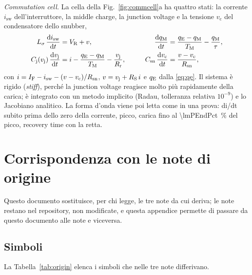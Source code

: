 \documentclass[10pt,a4paper]{scrartcl}
\let\newcommand\pdvaluedefine
\newcommand{\IF}{I_\mathrm{F}}
\newcommand{\VR}{V_\mathrm{R}}
\newcommand{\TM}{T_\mathrm{M}}
\newcommand{\qE}{q_\mathrm{E}}
\newcommand{\qM}{q_\mathrm{M}}
\newcommand{\vj}{v_\mathrm{j}}
\newcommand{\RS}{R_\mathrm{S}}
\newcommand{\Rr}{R_\mathrm{r}}
\newcommand{\Cj}{C_\mathrm{j}}
\newcommand{\Csn}{C_\mathrm{sn}}
\newcommand{\Rsn}{R_\mathrm{sn}}
\newcommand{\diff}{\mathrm{d}}
\newcommand{\Ls}{L_\sigma}                    %
\begin{document}
\emph{Commutation cell.} La cella della Fig.~\ref{fig:commcell}a ha quattro stati: la corrente $i_\mathrm{sw}$ dell'interruttore, la middle charge, la junction voltage e la tensione $v_\mathrm{c}$ del condensatore dello snubber,
\begin{equation}
\begin{aligned}
\Ls\,\frac{\diff i_\mathrm{sw}}{\diff t} &= \VR + v , &\qquad \frac{\diff\qM}{\diff t} &= \frac{\qE-\qM}{\TM} - \frac{\qM}{\tau} , \\
\Cj(\vj)\,\frac{\diff\vj}{\diff t} &= i - \frac{\qE-\qM}{\TM} - \frac{\vj}{\Rr} , &\qquad \Csn\,\frac{\diff v_\mathrm{c}}{\diff t} &= \frac{v - v_\mathrm{c}}{\Rsn} ,
\end{aligned}
\end{equation}
con $i = \IF - i_\mathrm{sw} - (v-v_\mathrm{c})/\Rsn$, $v = \vj + \RS\,i$ e $\qE$ dalla \eqref{eq:qe}. Il sistema è rigido (\emph{stiff}), perché la junction voltage reagisce molto più rapidamente della carica; è integrato con un metodo implicito (Radau, tolleranza relativa $10^{-9}$) e lo Jacobiano analitico. La forma d'onda viene poi letta come in una prova: di/dt subito prima dello zero della corrente, picco, carica fino al \SI{\lmPEndPct}{\percent} del picco, recovery time con la retta.

\clearpage
\section{Corrispondenza con le note di origine}
\label{app:origin}
Questo documento sostituisce, per chi legge, le tre note da cui deriva; le note restano nel repository, non modificate, e questa appendice permette di passare da questo documento alle note e viceversa.

\subsection{Simboli}
La Tabella~\ref{tab:origin} elenca i simboli che nelle tre note differivano.
\end{document}
